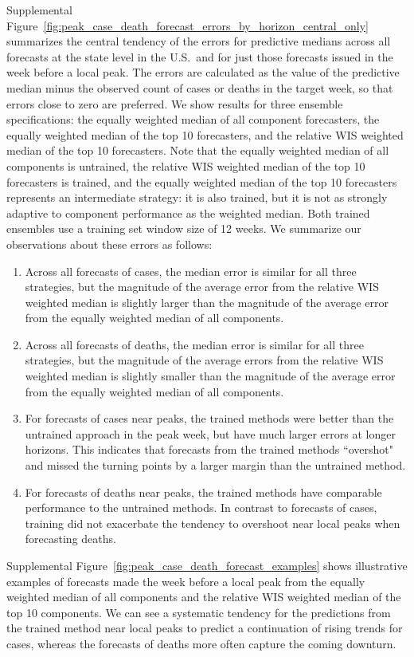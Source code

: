 \documentclass{article}
\begin{document}
Supplemental Figure~\ref{fig:peak_case_death_forecast_errors_by_horizon_central_only} summarizes the central tendency of the errors for predictive medians across all forecasts at the state level in the U.S.\ and for just those forecasts issued in the week before a local peak. The errors are calculated as the value of the predictive median minus the observed count of cases or deaths in the target week, so that errors close to zero are preferred. We show results for three ensemble specifications: the equally weighted median of all component forecasters, the equally weighted median of the top 10 forecasters, and the relative WIS weighted median of the top 10 forecasters. Note that the equally weighted median of all components is untrained, the relative WIS weighted median of the top 10 forecasters is trained, and the equally weighted median of the top 10 forecasters represents an intermediate strategy: it is also trained, but it is not as strongly adaptive to component performance as the weighted median. Both trained ensembles use a training set window size of 12 weeks. We summarize our observations about these errors as follows:
\begin{enumerate}
    \item Across all forecasts of cases, the median error is similar for all three strategies, but the magnitude of the average error from the relative WIS weighted median is slightly larger than the magnitude of the average error from the equally weighted median of all components.
    \item Across all forecasts of deaths, the median error is similar for all three strategies, but the magnitude of the average errors from the relative WIS weighted median is slightly smaller than the magnitude of the average error from the equally weighted median of all components.
    \item For forecasts of cases near peaks, the trained methods were better than the untrained approach in the peak week, but have much larger errors at longer horizons. This indicates that forecasts from the trained methods ``overshot" and missed the turning points by a larger margin than the untrained method.
    \item For forecasts of deaths near peaks, the trained methods have comparable performance to the untrained methods. In contrast to forecasts of cases, training did not exacerbate the tendency to overshoot near local peaks when forecasting deaths.
\end{enumerate}

Supplemental Figure~\ref{fig:peak_case_death_forecast_examples} shows illustrative examples of forecasts made the week before a local peak from the equally weighted median of all components and the relative WIS weighted median of the top 10 components. We can see a systematic tendency for the predictions from the trained method near local peaks to predict a continuation of rising trends for cases, whereas the forecasts of deaths more often capture the coming downturn.
\end{document}
